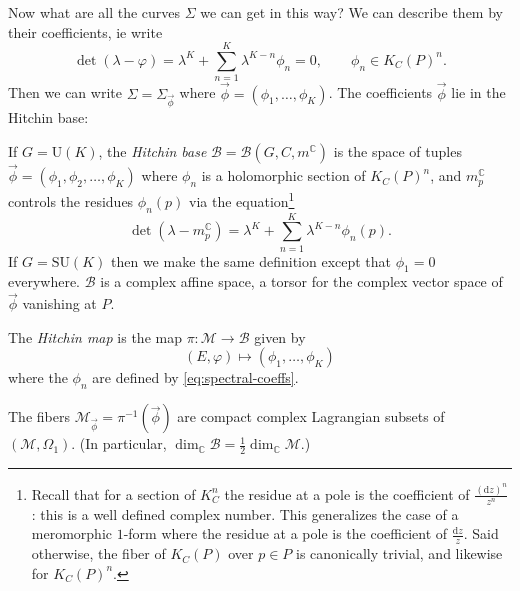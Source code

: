 \documentclass[12pt,letterpaper,reqno]{article}
\numberwithin{equation}{section}
\newcommand{\cB}{\ensuremath{\mathcal B}}
\newcommand{\cM}{\ensuremath{\mathcal M}}
\newcommand{\C}{\ensuremath{\mathbb C}}
\newcommand{\half}{\ensuremath{\frac{1}{2}}}
\newcommand{\de}{\mathrm{d}}
\newcommand{\vphi}{{\vec\phi}}
\newcommand{\ti}[1]{\textit{#1}}
\newcommand{\SU}{\mathrm{SU}}
\newcommand{\U}{\mathrm{U}}
\begin{document}
Now what are all the curves $\Sigma$
we can get in this way?
We can describe them by their coefficients, ie write
\begin{equation} \label{eq:spectral-coeffs}
  \det(\lambda - \varphi) = \lambda^K + \sum_{n=1}^K \lambda^{K-n} \phi_n = 0, \qquad \phi_n \in K_C(P)^n.
\end{equation}
Then we can write $\Sigma = \Sigma_{\vphi}$ where
$\vphi = (\phi_1, \dots, \phi_K)$.
The coefficients $\vphi$ lie in the Hitchin base:
\begin{defn}
If $G = \U(K)$,
the \ti{Hitchin base} $\cB = \cB(G,C,m^\C)$ is
the space of tuples $\vphi = (\phi_1, \phi_2, \dots, \phi_K)$
where $\phi_n$ is a holomorphic section of $K_C(P)^n$,
and $m_p^\C$ controls the residues $\phi_n(p)$ via the equation\footnote{Recall that for a section of $K_C^n$ the residue at a pole is the coefficient of $\frac{(\de z)^n}{z^n}$: this is a well
defined complex number. This generalizes the case of a meromorphic $1$-form
where the residue at a pole is the coefficient of $\frac{\de z}{z}$. Said otherwise, the fiber of
$K_C(P)$ over $p \in P$ is canonically trivial,
and likewise for $K_C(P)^n$.}
\begin{equation}
  \det (\lambda - m_p^\C) = \lambda^K + \sum_{n=1}^K \lambda^{K-n} \phi_n(p).
\end{equation}
If $G = \SU(K)$ then we make the same definition except that
$\phi_1 = 0$ everywhere.
$\cB$ is a complex affine space, a torsor for the complex vector space
of $\vphi$ vanishing at $P$.

\begin{defn}
The \ti{Hitchin map} is the map $\pi: \cM \to \cB$ given by
\begin{equation}
  (E, \varphi) \mapsto (\phi_1, \dots, \phi_K)
\end{equation}
where the $\phi_n$ are defined by \eqref{eq:spectral-coeffs}.
\end{defn}

\begin{prop} The fibers
$\cM_\vphi = \pi^{-1}(\vphi)$ 
are compact complex Lagrangian subsets of $(\cM, \Omega_1)$. (In particular, $\dim_\C \cB = \half \dim_\C \cM$.)
\end{prop}


\end{defn}
\end{document}
